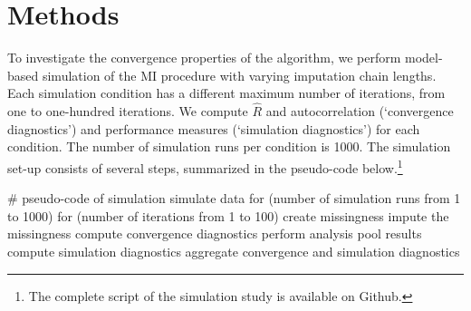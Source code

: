 \documentclass[article]{jss}
\begin{document}
% 
% 



\section{Methods} \label{sec:methods}

To investigate the convergence properties of the  algorithm, we perform model-based simulation of the MI procedure with varying imputation chain lengths. Each simulation condition has a different maximum number of iterations, from one to one-hundred iterations. We compute $\widehat{R}$ and autocorrelation (`convergence diagnostics') and performance measures (`simulation diagnostics') for each condition. The number of simulation runs per condition is 1000. %
The simulation set-up consists of several steps, summarized in the pseudo-code below.\footnote{The complete  script of the simulation study is available on Github.}

\begin{Code}
# pseudo-code of simulation 
simulate data 
for (number of simulation runs from 1 to 1000)
  for (number of iterations from 1 to 100)
    create missingness
    impute the missingness
    compute convergence diagnostics
    perform analysis
    pool results
    compute simulation diagnostics
aggregate convergence and simulation diagnostics
\end{Code}
\end{document}
